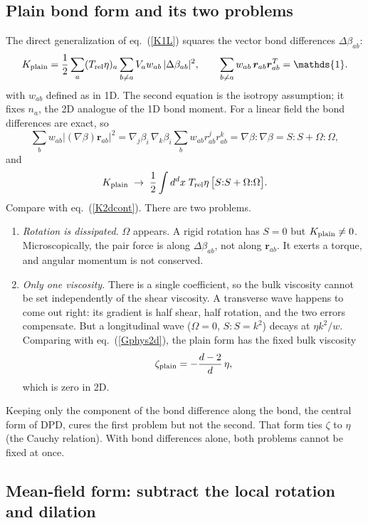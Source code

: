 \documentclass[11pt,aps,preprint,nofootinbib,superscriptaddress,tightenlines]{revtex4-2}
\def\st{\begin{equation}}
\def\stp{\end{equation}}
\def\Eq#1{eq.~(\ref{#1})}
\newcommand{\one}{\mathds{1}}
\begin{document}
\subsection{Plain bond form and its two problems}
\label{sec:plain2d}

The direct generalization of \Eq{K1L} squares the vector bond differences
$\Delta\beta_{ab}$:
\st
K_{\rm plain}=\frac12\sum_a(T_{\rm rel}\eta)_a\sum_{b\neq a}V_aw_{ab}\,
|\Delta\beta_{ab}|^2,\qquad
\sum_{b\neq a}w_{ab}\,\bm r_{ab}\bm r_{ab}^T=\one .
\label{Kplain}
\stp
with $w_{ab}$ defined as in 1D.  The second equation is the isotropy
assumption; it fixes $n_a$, the 2D analogue of the 1D bond moment.  For a linear
field the bond differences are exact, so
\st
\sum_bw_{ab}|(\nabla\beta)\bm r_{ab}|^2=\nabla_j\beta_i\,\nabla_k\beta_i\sum_bw_{ab}r^j_{ab}r^k_{ab}
=\nabla\beta{:}\nabla\beta=S{:}S+\Omega{:}\Omega ,
\stp
and
\st
K_{\rm plain}\;\to\;\frac12\int d^dx\;T_{\rm rel}\eta\,\big[S{:}S+\Omega{:}\Omega\big].
\label{Kplaincont}
\stp
Compare with \Eq{K2dcont}.  There are two problems.
\begin{enumerate}
\item \emph{Rotation is dissipated.}  $\Omega$ appears.  A rigid rotation has
  $S=0$ but $K_{\rm plain}\neq0$.  Microscopically, the pair force is along
  $\Delta\beta_{ab}$, not along $\bm r_{ab}$.  It exerts a
  torque, and angular momentum is not conserved.
\item \emph{Only one viscosity.}  There is a single coefficient, so the
  bulk viscosity cannot be set independently of the shear viscosity.  A
  transverse wave happens to come out right: its gradient is half shear, half
  rotation, and the two errors compensate.  But a longitudinal wave
  ($\Omega=0$, $S{:}S=k^2$) decays at $\eta k^2/w$.  Comparing with
  \Eq{Gphys2d}, the plain form has the fixed bulk viscosity
  \st
  \zeta_{\rm plain}=-\frac{d-2}{d}\,\eta ,
  \stp
  which is zero in 2D.
\end{enumerate}
Keeping only the component of the bond difference along the bond, the
central form of DPD, cures the first problem but not the second.
That form ties $\zeta$ to $\eta$ (the Cauchy relation).  With bond differences
alone, both problems cannot be fixed at once.

\subsection{Mean-field form: subtract the local rotation and dilation}
\label{sec:mf2d}
\end{document}
